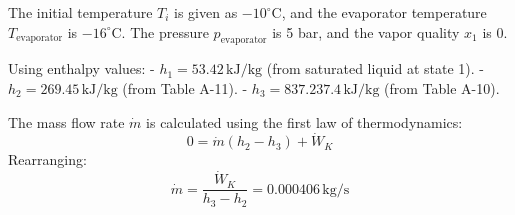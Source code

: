 The initial temperature \( T_i \) is given as \( -10^\circ\text{C} \), and the evaporator temperature \( T_{\text{evaporator}} \) is \( -16^\circ\text{C} \).  
The pressure \( p_{\text{evaporator}} \) is 5 bar, and the vapor quality \( x_1 \) is 0.  

Using enthalpy values:  
- \( h_1 = 53.42 \, \text{kJ/kg} \) (from saturated liquid at state 1).  
- \( h_2 = 269.45 \, \text{kJ/kg} \) (from Table A-11).  
- \( h_3 = 837.237.4 \, \text{kJ/kg} \) (from Table A-10).  

The mass flow rate \( \dot{m} \) is calculated using the first law of thermodynamics:  
\[
0 = \dot{m} \left( h_2 - h_3 \right) + \dot{W}_K  
\]
Rearranging:  
\[
\dot{m} = \frac{\dot{W}_K}{h_3 - h_2} = 0.000406 \, \text{kg/s}  
\]